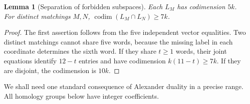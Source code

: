 \documentclass[a4paper,11pt,reqno]{amsart}
\newcommand{\codim}{\operatorname{codim}}
\newtheorem{lemma}[theorem]{Lemma}
\theoremstyle{definition}
\theoremstyle{remark}
\numberwithin{equation}{section}
\begin{document}
\begin{lemma}[Separation of forbidden subspaces]\label{lem:codim}
Each $L_M$ has codimension $5k$. For distinct matchings $M,N$,
$\codim(L_M\cap L_N)\ge7k$.
\end{lemma}
\begin{proof}
The first assertion follows from the five independent vector equalities.
Two distinct matchings cannot share five words, because the missing label
in each coordinate determines the sixth word. If they share $t\ge1$
words, their joint equations identify $12-t$ entries and have codimension
$k(11-t)\ge7k$. If they are disjoint, the codimension is $10k$.
\end{proof}

We shall need one standard consequence of Alexander duality in a precise
range. All homology groups below have integer coefficients.
\end{document}
